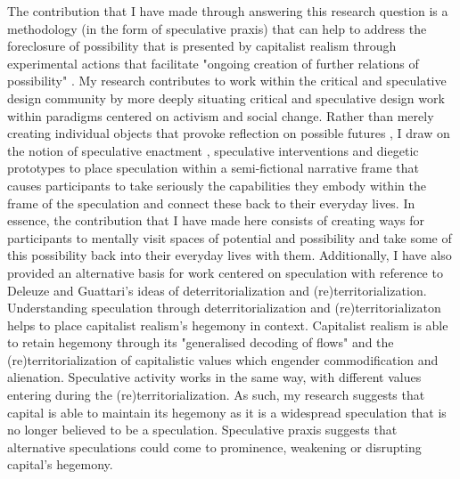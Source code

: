 The contribution that I have made through answering this research question is a methodology (in the form of speculative praxis) that can help to address the foreclosure of possibility that is presented by capitalist realism through experimental actions that facilitate "ongoing creation of further relations of possibility" \citep[320]{harrison_future_2020}. My research contributes to work within the critical and speculative design community by more deeply situating critical and speculative design work within paradigms centered on activism and social change. Rather than merely creating individual objects that provoke reflection on possible futures \citep{auger_speculative_2013, dunne_design_2001, dunne_speculative_2013}, I draw on the notion of speculative enactment \citep{elsden_speculative_2017}, speculative interventions \citep{disalvo_irony_2016} and diegetic prototypes \citep{kirby_future_2010} to place speculation within a semi-fictional narrative frame that causes participants to take seriously the capabilities they embody within the frame of the speculation and connect these back to their everyday lives. In essence, the contribution that I have made here consists of creating ways for participants to mentally visit spaces of potential and possibility and take some of this possibility back into their everyday lives with them. Additionally, I have also provided an alternative basis for work centered on speculation with reference to Deleuze and Guattari's ideas of deterritorialization and (re)territorialization. Understanding speculation through deterritorialization and (re)territorializaton helps to place capitalist realism's hegemony in context. Capitalist realism is able to retain hegemony through its "generalised decoding of flows" \citep[153]{deleuze_anti-oedipus:_1983} and the (re)territorialization of capitalistic values which engender commodification and alienation. Speculative activity works in the same way, with different values entering during the (re)territorialization. As such, my research suggests that capital is able to maintain its hegemony as it is a widespread speculation that is no longer believed to be a speculation. Speculative praxis suggests that alternative speculations could come to prominence, weakening or disrupting capital's hegemony. 

